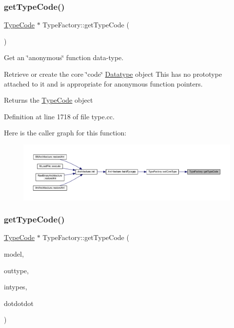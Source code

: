 \subsubsection{\texorpdfstring{getTypeCode()}{getTypeCode()}\hspace{0.1cm}{\footnotesize\ttfamily [1/2]}}
{\footnotesize\ttfamily \mbox{\hyperlink{class_type_code}{Type\+Code}} $\ast$ Type\+Factory\+::get\+Type\+Code (\begin{DoxyParamCaption}\item[{void}]{ }\end{DoxyParamCaption})}



Get an \char`\"{}anonymous\char`\"{} function data-\/type. 

Retrieve or create the core \char`\"{}code\char`\"{} \mbox{\hyperlink{class_datatype}{Datatype}} object This has no prototype attached to it and is appropriate for anonymous function pointers. \begin{DoxyReturn}{Returns}
the \mbox{\hyperlink{class_type_code}{Type\+Code}} object 
\end{DoxyReturn}


Definition at line 1718 of file type.\+cc.

Here is the caller graph for this function\+:
\nopagebreak
\begin{figure}[H]
\begin{center}
\leavevmode
\includegraphics[width=350pt]{class_type_factory_a47c3d70d9598d2b4ce3770593f6ce97e_icgraph}
\end{center}
\end{figure}
\mbox{\label{class_type_factory_a99362bf53b0ead2d57a2221bc2fd03cc}} 
\subsubsection{\texorpdfstring{getTypeCode()}{getTypeCode()}\hspace{0.1cm}{\footnotesize\ttfamily [2/2]}}
{\footnotesize\ttfamily \mbox{\hyperlink{class_type_code}{Type\+Code}} $\ast$ Type\+Factory\+::get\+Type\+Code (\begin{DoxyParamCaption}\item[{\mbox{\hyperlink{class_proto_model}{Proto\+Model}} $\ast$}]{model,  }\item[{\mbox{\hyperlink{class_datatype}{Datatype}} $\ast$}]{outtype,  }\item[{const vector$<$ \mbox{\hyperlink{class_datatype}{Datatype}} $\ast$ $>$ \&}]{intypes,  }\item[{bool}]{dotdotdot }\end{DoxyParamCaption})}



